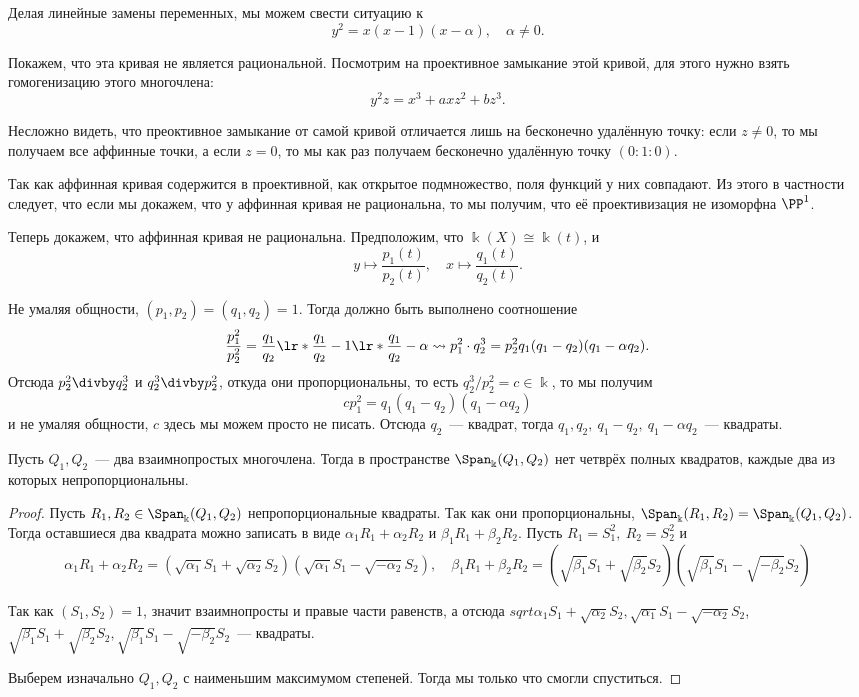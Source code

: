 	 Делая линейные замены переменных, мы можем свести ситуацию к 
	 \[
	 	y^2 = x(x - 1)(x - \alpha), \quad \alpha \neq 0.
	 \]

	 Покажем, что эта кривая не является рациональной. Посмотрим на проективное замыкание этой кривой, для этого нужно взять гомогенизацию этого многочлена: 
	 \[
	 	y^2z = x^3 + axz^2 + bz^3.
	 \]

	 Несложно видеть, что преоктивное замыкание от самой кривой отличается лишь на бесконечно удалённую точку: если $z \neq 0$, то мы получаем все аффинные точки, а если $z = 0$, то мы как раз получаем бесконечно удалённую точку $(0 : 1 : 0)$. 

	 Так как аффинная кривая содержится в проективной, как открытое подмножество, поля функций у них совпадают. Из этого в частности следует, что если мы докажем, что у аффинная кривая не рациональна, то мы получим, что её проективизация не изоморфна $\PP^1$.

	 Теперь докажем, что аффинная кривая не рациональна. Предположим, что $\Bbbk(X) \cong \Bbbk(t)$, и
	 \[
	 	y \mapsto \frac{p_1(t)}{p_2(t)}, \quad x \mapsto \frac{q_1(t)}{q_2(t)}.
	 \]

	 Не умаляя общности, $(p_1, p_2) = (q_1, q_2) = 1$. Тогда должно быть выполнено соотношение 
	 \[
	 	\frac{p_1^2}{p_2^2} = \frac{q_1}{q_2}\lr*{\frac{q_1}{q_2} - 1}\lr*{\frac{q_1}{q_2} - \alpha} \rightsquigarrow p_1^2 \cdot q_2^3 = p_2^2 q_1(q_1 - q_2)(q_1 - \alpha q_2). 
	 \]
	 Отсюда $p_2^2 \divby q_2^3$  и $q_2^3 \divby p_2^2$, откуда они пропорциональны, то есть $q_2^3 / p_2^2 = c \in \Bbbk$, то мы получим 
	 \[
	 	c p_1^2 = q_1(q_1 - q_2)(q_1 - \alpha q_2)
	 \]
	 и не умаляя общности, $c$ здесь мы можем просто не писать. Отсюда $q_2$~--- квадрат, тогда $  q_1, q_2, \ q_1 - q_2, \ q_1 - \alpha q_2$~--- квадраты. 

	 \begin{statement} 
	 	Пусть $Q_1, Q_2$~--- два взаимнопростых многочлена. Тогда в пространстве $\Span_{\Bbbk}(Q_1, Q_2)$ нет четврёх полных квадратов, каждые два из которых непропорциональны. 
	 \end{statement}
	 \begin{proof}
	 	Пусть $R_1, R_2 \in \Span_{\Bbbk}(Q_1, Q_2)$ непропорциональные квадраты. Так как они пропорциональны, $\Span_{\Bbbk}(R_1, R_2) = \Span_{\Bbbk}(Q_1, Q_2)$. Тогда оставшиеся два квадрата можно записать в виде $\alpha_1 R_1 + \alpha_2 R_2$ и $\beta_1 R_1 + \beta_2 R_2$. Пусть $R_1 = S_1^2, \ R_2 = S_2^2$ и  
	 	\[
	 		\alpha_1 R_1 + \alpha_2 R_2 = (\sqrt{\alpha_1} S_1 + \sqrt{\alpha_2}S_2)(\sqrt{\alpha_1} S_1 - \sqrt{-\alpha_2}S_2), \quad \beta_1 R_1 + \beta_2 R_2 = (\sqrt{\beta_1} S_1 + \sqrt{\beta_2}S_2)(\sqrt{\beta_1} S_1 - \sqrt{-\beta_2}S_2)
	 	\]

	 	Так как $(S_1, S_2) = 1$, значит взаимнопросты и правые части равенств, а отсюда $sqrt{\alpha_1} S_1 + \sqrt{\alpha_2}S_2, \sqrt{\alpha_1} S_1 - \sqrt{-\alpha_2}S_2$, $\sqrt{\beta_1} S_1 + \sqrt{\beta_2}S_2, \sqrt{\beta_1} S_1 - \sqrt{-\beta_2}S_2$~--- квадраты. 

	 	Выберем изначально $Q_1, Q_2$ с наименьшим максимумом степеней. Тогда мы только что смогли спуститься. 
	 \end{proof}


